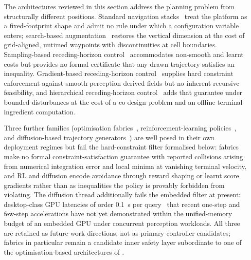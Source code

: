 \documentclass[11pt,a4paper]{article}
\begin{document}
The architectures reviewed in this section address the planning problem from structurally different positions. Standard navigation stacks~\cite{luLayeredCostmapsContextsensitive2014,macenski2020nav2,macenskiOpenSourceCostAwareKinematically2025} treat the platform as a fixed-footprint shape and admit no rule under which a configuration variable enters; search-based augmentation~\cite{gochev2011adaptive,bockmannUgv_nav4dAdvancedMultiSurface2024,yangEfficientGlobalNavigational2024,liAutonomousNavigationUnderactuated2023} restores the vertical dimension at the cost of grid-aligned, untimed waypoints with discontinuities at cell boundaries. Sampling-based receding-horizon control~\cite{williams2017infomppi} accommodates non-smooth and learnt costs but provides no formal certificate that any drawn trajectory satisfies an inequality. Gradient-based receding-horizon control~\cite{grandiaPerceptiveLocomotionNonlinear2022,gaertnerCollisionFreeMPCLegged2021,jacquet2025sdfnmpc,kohlerMPCFrameworkEfficient2025} supplies hard constraint enforcement against smooth perception-derived fields but no inherent recursive feasibility, and hierarchical receding-horizon control~\cite{bendersEmbeddedHierarchicalMPC2025} adds that guarantee under bounded disturbances at the cost of a co-design problem and an offline terminal-ingredient computation.

Three further families (optimisation fabrics~\cite{spahn2023fabrics,spahn2025implicit,merva2025g3f}, reinforcement-learning policies~\cite{xuDexterousLeggedLocomotion2024,mikiLearningWalkConfined2024,freyLocomotionPolicyGuided2022}, and diffusion-based trajectory generators~\cite{yan2025m2diffuser,cao2025dare,chi2023diffusionpolicy}) are well posed in their own deployment regimes but fail the hard-constraint filter formalised below: fabrics make no formal constraint-satisfaction guarantee with reported collisions arising from numerical integration error and local minima at vanishing terminal velocity, and RL and diffusion encode avoidance through reward shaping or learnt score gradients rather than as inequalities the policy is provably forbidden from violating. The diffusion thread additionally fails the embedded filter at present: desktop-class GPU latencies of order \SI{0.1}{\second} per query~\cite{chi2023diffusionpolicy} that recent one-step and few-step accelerations have not yet demonstrated within the unified-memory budget of an embedded GPU under concurrent perception workloads. All three are retained as future-work directions, not as primary controller candidates; fabrics in particular remain a candidate inner safety layer subordinate to one of the optimisation-based architectures of .
\end{document}

